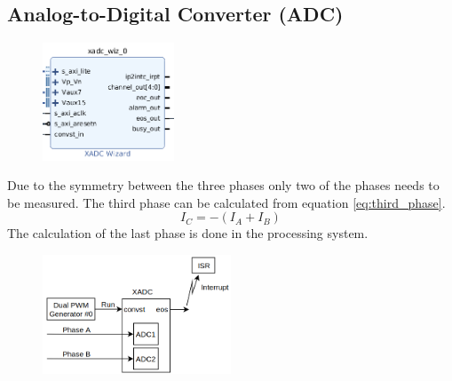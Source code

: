 \subsection{Analog-to-Digital Converter (ADC)}


\begin{figure}[H]
	\centering
	\includegraphics[width=0.35\textwidth]{pictures/software/adc.png}
	\caption{}
	\label{fig:adc_module}
\end{figure}



Due to the symmetry between the three phases only two of the phases needs to be measured. The third phase can be calculated from equation \ref{eq:third_phase}.
\begin{equation}
    I_C = -(I_A + I_B)
    \label{eq:third_phase}
\end{equation}
The calculation of the last phase is done in the processing system.



\begin{figure}[H]
	\centering
	\includegraphics[width=0.5\textwidth]{pictures/software/adc_block_diagram.png}
	\caption{}
	\label{fig:adc_block_diagram}
\end{figure}



